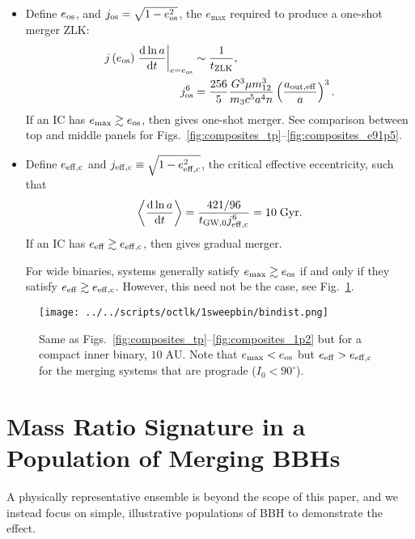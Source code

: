 \documentclass[
        fleqn,
        usenatbib,
    ]{mnras}
\newcommand*{\rd}[2]{\frac{\mathrm{d}#1}{\mathrm{d}#2}}
\newcommand*{\at}[1]{\left.#1\right|}
\newcommand*{\ev}[1]{\left\langle#1\right\rangle}
\newcommand*{\p}[1]{\left(#1\right)}
\newlength{\colummwidth}
\begin{document}
\begin{itemize}
    \item Define $e_{\rm os}$, and $j_{\rm os} = \sqrt{1 - e_{\rm os}^2}$, the
        $e_{\max}$ required to produce a one-shot merger ZLK\@:
        \begin{align}
            j\p{e_{\rm os}}\at{\rd{\ln a}{t}}_{e = e_{\rm os}} &\sim
                \frac{1}{t_{\rm ZLK}},\\
            j_{\rm os}^6
                &= \frac{256}{5}\frac{G^3 \mu m_{12}^3}{m_3c^5a^4n}
                    \p{\frac{a_{\rm out, eff}}{a}}^3.
        \end{align}
        If an IC has $e_{\max} \gtrsim e_{\rm os}$, then gives one-shot merger.
        See comparison between top and middle panels for
        Figs.~\ref{fig:composites_tp}--\ref{fig:composites_e91p5}.

    \item Define $e_{\rm eff, c}$ and $j_{\rm eff, c} \equiv \sqrt{1 - e_{\rm
        eff, c}^2}$, the critical effective eccentricity, such that
        \begin{equation}
            \ev{\rd{\ln a}{t}} = \frac{421/96}{t_{\rm GW, 0}j_{\rm eff, c}^6}
                = 10\;\mathrm{Gyr}.
        \end{equation}
        If an IC has $e_{\rm eff} \gtrsim e_{\rm eff, c}$, then gives gradual
        merger.

        For wide binaries, systems generally satisfy $e_{\max} \gtrsim e_{\rm
        os}$ if and only if they satisfy $e_{\rm eff} \gtrsim e_{\rm eff, c}$.
        However, this need not be the case, see
        Fig.~\ref{fig:composite_bindist}.
\end{itemize}
\begin{figure}
    \centering
    \texttt{[image: ../../scripts/octlk/1sweepbin/bindist.png]}
    \caption{Same as Figs.~\ref{fig:composites_tp}--\ref{fig:composites_1p2} but
    for a compact inner binary, $10\;\mathrm{AU}$. Note that $e_{\max} < e_{\rm
    os}$ but $e_{\rm eff} > e_{\rm eff, c}$ for the merging systems that are
    prograde ($I_0 < 90^\circ$). }\label{fig:composite_bindist}
\end{figure}

\section{Mass Ratio Signature in a Population of Merging BBHs}

A physically representative ensemble is beyond the scope of this paper, and we
instead focus on simple, illustrative populations of BBH to demonstrate the
effect.
\end{document}
